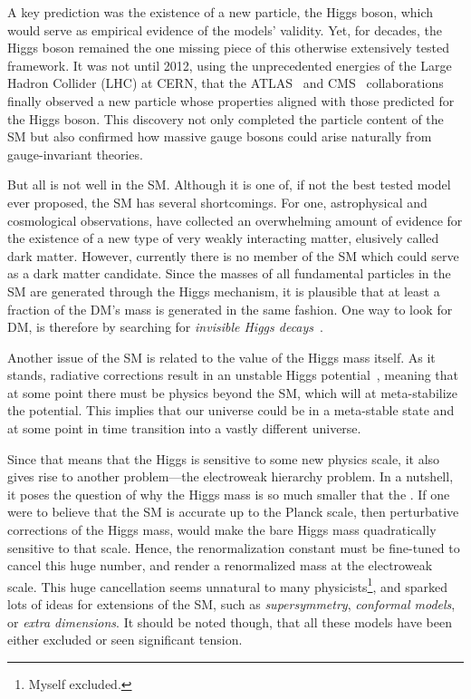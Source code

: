 A key prediction was the existence of a new particle, the Higgs boson, which would serve as empirical evidence of the models' validity. Yet, for decades, the Higgs boson remained the one missing piece of this otherwise extensively tested framework. It was not until 2012, using the unprecedented energies of the Large Hadron Collider (\acs{LHC}) at CERN, that the ATLAS~\cite{ATLAS:2012yve} and CMS~\cite{CMS:2012qbp} collaborations finally observed a new particle whose properties aligned with those predicted for the Higgs boson. This discovery not only completed the particle content of the \acs{SM} but also confirmed how massive gauge bosons could arise naturally from gauge-invariant theories.

But all is not well in the \acs{SM}. Although it is one of, if not the best tested model ever proposed, the \acs{SM} has several shortcomings. For one, astrophysical and cosmological observations, have collected an overwhelming amount of evidence for the existence of a new type of very weakly interacting matter, elusively called dark matter. However, currently there is no member of the \acs{SM} which could serve as a dark matter candidate. Since the masses of all fundamental particles in the \acs{SM} are generated through the Higgs mechanism, it is plausible that at least a fraction of the \acs{DM}'s mass is generated in the same fashion. One way to look for \acs{DM}, is therefore by searching for \textit{invisible Higgs decays}~\cite{ATLAS:2017nyv, CMS:2016dhk}.

Another issue of the \acs{SM} is related to the value of the Higgs mass itself. As it stands, radiative corrections result in an unstable Higgs potential~\cite{Degrassi:2012ry}, meaning that at some point there must be physics beyond the \acs{SM}, which will at meta-stabilize the potential. This implies that our universe could be in a meta-stable state and at some point in time transition into a vastly different universe.

Since that means that the Higgs is sensitive to some new physics scale, it also gives rise to another problem---the electroweak hierarchy problem. In a nutshell, it poses the question of why the Higgs mass is so much smaller that the . If one were to believe that the \acs{SM} is accurate up to the Planck scale, then perturbative corrections of the Higgs mass, would make the bare Higgs mass quadratically sensitive to that scale. Hence, the renormalization constant must be fine-tuned to cancel this huge number, and render a renormalized mass at the electroweak scale. This huge cancellation seems unnatural to many physicists\footnote{Myself excluded.}, and sparked lots of ideas for extensions of the \acs{SM}, such as \textit{supersymmetry}, \textit{conformal models}, or \textit{extra dimensions}. It should be noted though, that all these models have been either excluded or seen significant tension.

